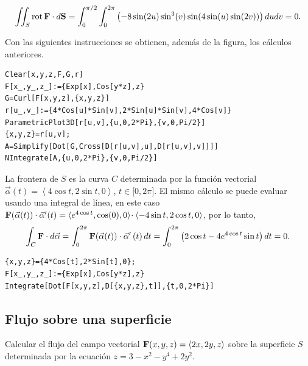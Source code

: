 \begin{gather*}
\iint_{S}{\rm rot}\,{\bf F}\cdot d{\bf S}=
\int_{0}^{\pi /2}\int_{0}^{2\pi}\left( -8\sin(2u)\sin^3(v)\sin(4\sin(u)\sin(2v))\right)dudv= 0.
\end{gather*}

Con las siguientes instrucciones se obtienen, además de la figura, los cálculos anteriores.

\begin{tcolorbox}[title=\bf Instrucción \verb"Mathematica"]\begin{Verbatim}[formatcom=\letraverbatim]
Clear[x,y,z,F,G,r]
F[x_,y_,z_]:={Exp[x],Cos[y*z],z}
G=Curl[F[x,y,z],{x,y,z}]
r[u_,v_]:={4*Cos[u]*Sin[v],2*Sin[u]*Sin[v],4*Cos[v]}
ParametricPlot3D[r[u,v],{u,0,2*Pi},{v,0,Pi/2}]
{x,y,z}=r[u,v];
A=Simplify[Dot[G,Cross[D[r[u,v],u],D[r[u,v],v]]]]
NIntegrate[A,{u,0,2*Pi},{v,0,Pi/2}]
\end{Verbatim}
\end{tcolorbox}

La frontera de $S$ es la curva $C$ determinada por la función vectorial
$\vec{\alpha}(t) =\left\langle 4\cos t,2\sin t,0\right\rangle$, $t\in \lbrack 0,2\pi ]$.
El mismo cálculo se puede evaluar usando una integral de línea, en este caso
${\bf F}(\vec{\alpha}(t))\cdot \vec{\alpha}^{\prime}(t)=\langle e^{4\cos t},\cos(0),0\rangle\!\cdot\langle -4\sin t,2\cos t,0\rangle$,
por lo tanto,
\[\int_{C}{\bf F}\cdot d\vec{\alpha} = \int_{0}^{2\pi}{\bf F}(\vec{\alpha}(t))\cdot
\vec{\alpha}^{\prime }\left( t\right) dt = \int_{0}^{2\pi}\left( 2\cos t-4e^{4\cos t}\sin t\right) dt= 0.\]

\begin{tcolorbox}[title=\bf Instrucción \verb"Mathematica"]\begin{Verbatim}[formatcom=\letraverbatim]
{x,y,z}={4*Cos[t],2*Sin[t],0};
F[x_,y_,z_]:={Exp[x],Cos[y*z],z}
Integrate[Dot[F[x,y,z],D[{x,y,z},t]],{t,0,2*Pi}]
\end{Verbatim}
\end{tcolorbox}

\subsection{Flujo sobre una superficie}

Calcular el flujo del campo vectorial ${\bf F}(x,y,z)= \langle 2x,2y,z\rangle$ sobre la superficie $S$
determinada por la ecuación $z=3-x^2-y^4+2y^2$.


